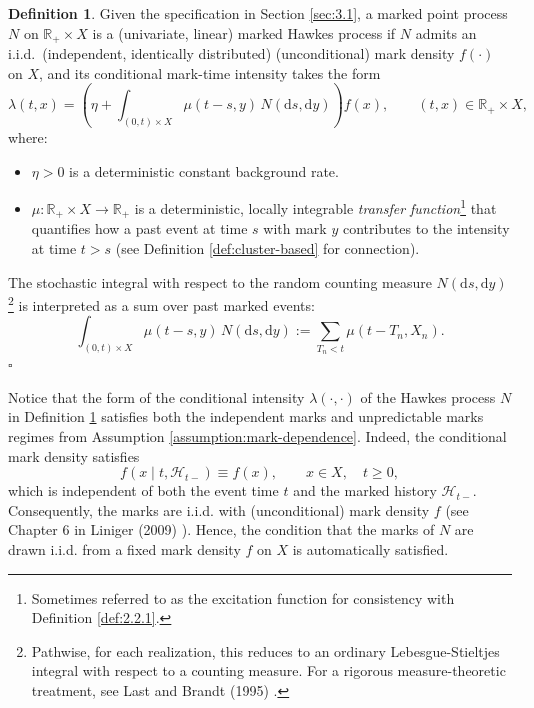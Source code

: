\documentclass[12pt,a4paper]{report}
\theoremstyle{plain}
\theoremstyle{definition}
\newtheorem{definition}{Definition}[section]
\theoremstyle{remark}
\newcommand{\1}{\mathbf{1}}
\begin{document}
\begin{definition}\label{def:marked-HP}
Given the specification in Section \ref{sec:3.1}, a marked point process $N$ on $\mathbb{R}_+ \times X$ is a (univariate, linear) marked Hawkes process if $N$ admits an i.i.d.\ (independent, identically distributed) (unconditional) mark density $f(\cdot)$ on $X$, and its conditional mark-time intensity takes the form
\begin{equation}\label{eq:marked-HP}
\lambda(t,x) = \left( \eta + \int_{(0,t)\times X} \mu(t-s,y) \, N(\mathrm{d}s,\mathrm{d}y) \right) f(x), \qquad (t,x)\in \mathbb{R}_+\times X,
\end{equation}
where:
\begin{itemize}
\item $\eta > 0$ is a deterministic constant background rate.
\item $\mu: \mathbb{R}_+ \times X \to \mathbb{R}_+$ is a deterministic, locally integrable \emph{transfer function}\footnote{Sometimes referred to as the excitation function for consistency with Definition \ref{def:2.2.1}.} that quantifies how a past event at time $s$ with mark $y$ contributes to the intensity at time $t > s$ (see Definition \ref{def:cluster-based} for connection).
\end{itemize}
The stochastic integral with respect to the random counting measure $N(\mathrm{d}s,\mathrm{d}y)$\footnote{Pathwise, for each realization, this reduces to an ordinary Lebesgue-Stieltjes integral with respect to a counting measure. For a rigorous measure-theoretic treatment, see Last and Brandt (1995) \cite{LB95}.} is interpreted as a sum over past marked events:
\[
\int_{(0,t)\times X} \mu(t-s,y) \, N(\mathrm{d}s,\mathrm{d}y) := \sum_{T_n < t} \mu(t - T_n, X_n).
\]
\hfill $\square$
\end{definition}

\noindent
Notice that the form of the conditional intensity $\lambda(\cdot,\cdot)$ of the Hawkes process $N$ in Definition \ref{def:marked-HP} satisfies both the independent marks and unpredictable marks regimes from Assumption \ref{assumption:mark-dependence}. Indeed, the conditional mark density satisfies
\[
f(x\mid t,\mathcal{H}_{t-}) \equiv f(x), \qquad x\in X,\quad t\ge 0,
\]
which is independent of both the event time $t$ and the marked history $\mathcal{H}_{t-}$. Consequently, the marks are i.i.d. with (unconditional) mark density $f$ (see Chapter 6 in Liniger (2009) \cite{Lin09}). Hence, the condition that the marks of $N$ are drawn i.i.d. from a fixed mark density $f$ on $X$ is automatically satisfied.
\end{document}
